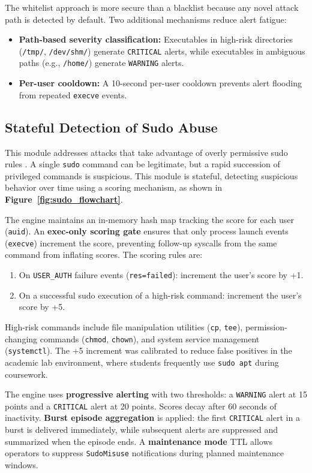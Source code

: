 \documentclass[journal]{./IEEEtran}
\begin{document}
The whitelist approach is more secure than a blacklist because any novel attack path is detected by default. Two additional mechanisms reduce alert fatigue:
\begin{itemize}
    \item \textbf{Path-based severity classification:} Executables in high-risk directories (\texttt{/tmp/}, \texttt{/dev/shm/}) generate \texttt{CRITICAL} alerts, while executables in ambiguous paths (e.g., \texttt{/home/}) generate \texttt{WARNING} alerts.
    \item \textbf{Per-user cooldown:} A 10-second per-user cooldown prevents alert flooding from repeated \texttt{execve} events.
\end{itemize}

\subsection{Stateful Detection of Sudo Abuse}
This module addresses attacks that take advantage of overly permissive sudo rules \cite{happe2024}. A single \texttt{sudo} command can be legitimate, but a rapid succession of privileged commands is suspicious. This module is stateful, detecting suspicious behavior over time using a scoring mechanism, as shown in \textbf{Figure~\ref{fig:sudo_flowchart}}.

The engine maintains an in-memory hash map tracking the score for each user (\texttt{auid}). An \textbf{exec-only scoring gate} ensures that only process launch events (\texttt{execve}) increment the score, preventing follow-up syscalls from the same command from inflating scores. The scoring rules are:

\begin{enumerate}
    \item On \texttt{USER\_AUTH} failure events (\texttt{res=failed}): increment the user's score by +1.
    \item On a successful sudo execution of a high-risk command: increment the user's score by +5.
\end{enumerate}

High-risk commands include file manipulation utilities (\texttt{cp}, \texttt{tee}), permission-changing commands (\texttt{chmod}, \texttt{chown}), and system service management (\texttt{systemctl}). The +5 increment was calibrated to reduce false positives in the academic lab environment, where students frequently use \texttt{sudo apt} during coursework.

The engine uses \textbf{progressive alerting} with two thresholds: a \texttt{WARNING} alert at 15 points and a \texttt{CRITICAL} alert at 20 points. Scores decay after 60 seconds of inactivity. \textbf{Burst episode aggregation} is applied: the first \texttt{CRITICAL} alert in a burst is delivered immediately, while subsequent alerts are suppressed and summarized when the episode ends. A \textbf{maintenance mode} TTL allows operators to suppress \texttt{SudoMisuse} notifications during planned maintenance windows.
\end{document}
